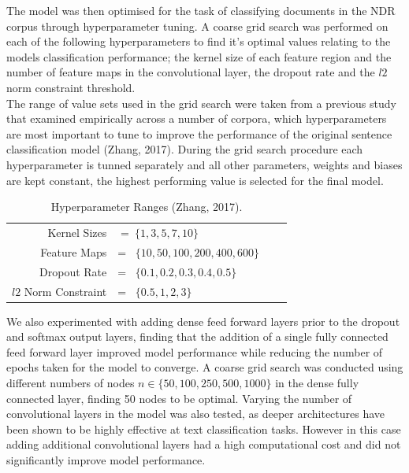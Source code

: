 \documentclass[a4paper,12pt]{article}
\begin{document}
The model was then optimised for the task of classifying documents in the NDR corpus through hyperparameter tuning. A coarse grid search was performed on each of the following hyperparameters to find it's optimal values relating to the models classification performance; the kernel size of each feature region and the number of feature maps in the convolutional layer, the dropout rate and the $l2$ norm constraint threshold.\\

The range of value sets used in the grid search were taken from a previous study that examined empirically across a number of corpora, which hyperparameters are most important to tune to improve the performance of the original sentence classification model (Zhang, 2017). During the grid search procedure each hyperparameter is tunned separately and  all other parameters, weights and biases are kept constant, the highest performing value is selected for the final model.\\

\begin{table}[H]
	\centering
	\begin{tabular}{ r l c  c }
	Kernel Sizes & $= \ \{1, 3, 5, 7, 10\}$\\
	Feature Maps &= \ $\{10, 50, 100, 200, 400, 600\}$\\
	Dropout Rate &= \ $\{0.1, 0.2, 0.3, 0.4, 0.5\}$\\
	$l2$ Norm Constraint &= \ $\{0.5, 1, 2, 3\}$\\
	\end{tabular}
	\caption{\label{tab:table-name}Hyperparameter Ranges (Zhang, 2017).}
\end{table}

We also experimented with adding dense feed forward layers prior to the dropout and softmax output layers, finding that the addition of a single fully connected feed forward layer improved model performance while reducing the number of epochs taken for the model to converge. A coarse grid search was conducted using different numbers of nodes $n \in \{ 50, 100, 250, 500, 1000 \}$ in the dense fully connected layer, finding 50 nodes to be optimal. Varying the number of convolutional layers in the model was also tested, as deeper architectures have been shown to be highly effective at text classification tasks. However in this case adding additional convolutional layers had a high computational cost and did not significantly improve model performance.\\
\end{document}
